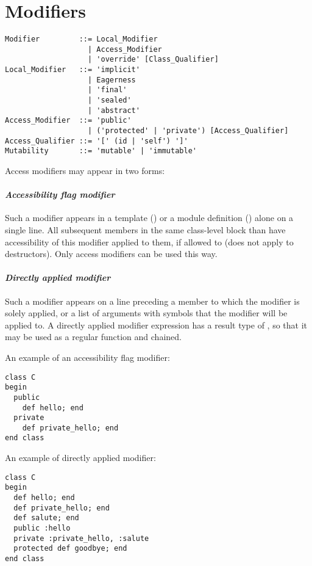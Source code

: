 \section{Modifiers}
\label{sec:modifiers}

\grammar\begin{lstlisting}
Modifier         ::= Local_Modifier
                   | Access_Modifier
                   | 'override' [Class_Qualifier]
Local_Modifier   ::= 'implicit'
                   | Eagerness
                   | 'final'
                   | 'sealed'
                   | 'abstract'
Access_Modifier  ::= 'public'
                   | ('protected' | 'private') [Access_Qualifier]
Access_Qualifier ::= '[' (id | 'self') ']'
Mutability       ::= 'mutable' | 'immutable'
\end{lstlisting}

Access modifiers may appear in two forms:

\paragraph{\em Accessibility flag modifier}
Such a modifier appears in a template () or a module definition () alone on a single line. All subsequent members in the same class-level block than have accessibility of this modifier applied to them, if allowed to (does not apply to destructors). Only access modifiers can be used this way. 

\paragraph{\em Directly applied modifier}
Such a modifier appears on a line preceding a member to which the modifier is solely applied, or a list of arguments with symbols that the modifier will be applied to. A directly applied modifier expression has a result type of , so that it may be used as a regular function and chained. 

\example An example of an accessibility flag modifier:
\begin{lstlisting}
class C
begin
  public
    def hello; end
  private
    def private_hello; end
end class
\end{lstlisting}

\example An example of directly applied modifier:
\begin{lstlisting}
class C
begin
  def hello; end
  def private_hello; end
  def salute; end
  public :hello
  private :private_hello, :salute
  protected def goodbye; end
end class
\end{lstlisting}

